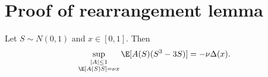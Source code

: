 
\section{Proof of rearrangement lemma}
\label{app:rearrangement_lemma}

\begin{lemma}
Let $S\sim N(0,1)$ and $x\in[0,1]$. Then
\[
        \sup_{\substack{|A|\le1\\ \E[A(S)S]=\nu x}}
        \E[A(S)(S^3-3S)]
        =-\nu\Delta(x).
\]
\end{lemma}

